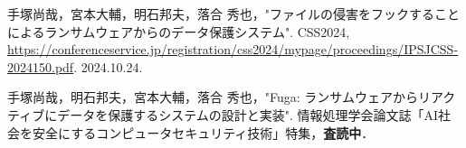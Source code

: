 \item 手塚尚哉，宮本大輔，明石邦夫，落合 秀也，"ファイルの侵害をフックすることによるランサムウェアからのデータ保護システム". CSS2024,
\url{https://conferenceservice.jp/registration/css2024/mypage/proceedings/IPSJCSS-2024150.pdf}. 2024.10.24.

\item 手塚尚哉，明石邦夫，宮本大輔，落合 秀也，"Fuga: ランサムウェアからリアクティブにデータを保護するシステムの設計と実装".
情報処理学会論文誌「AI社会を安全にするコンピュータセキュリティ技術」特集，\textbf{査読中}．

